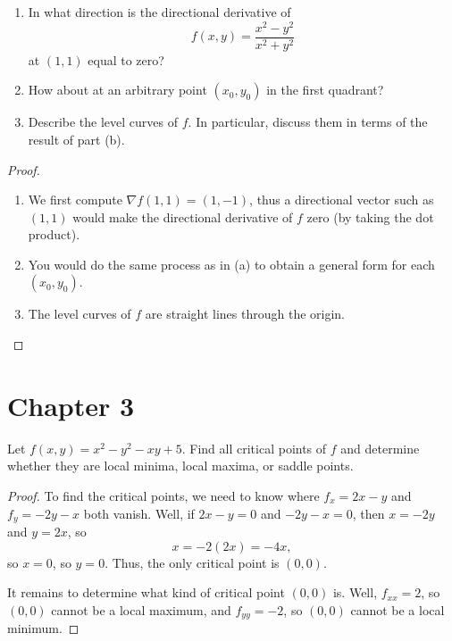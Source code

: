 \documentclass[openany]{book}
\begin{document}
\begin{prob}[59]
    \begin{enumerate}
        \item[(a)] In what direction is the directional derivative of  
        \[
        f(x, y) = \frac{x^2 - y^2}{x^2 + y^2}
        \]
        at \((1, 1)\) equal to zero?  
        \item[(b)] How about at an arbitrary point \((x_0, y_0)\) in the first quadrant?  
        \item[(c)] Describe the level curves of \(f\). In particular, discuss them in terms of the result of part (b).
    \end{enumerate}
\end{prob}
\begin{proof}
    \begin{enumerate}
        \item[(a)] We first compute $\nabla f(1,1)=(1,-1)$, thus a directional vector such as $(1,1)$ would make the directional derivative of $f$ zero (by taking the dot product).
        \item[(b)] You would do the same process as in (a) to obtain a general form for each $(x_0, y_0)$.
        \item[(c)] The level curves of $f$ are straight lines through the origin.
    \end{enumerate}
\end{proof}






\section{Chapter 3}
\begin{prob}[3]
    Let \( f(x, y) = x^2 - y^2 - xy + 5 \). Find all critical points of \( f \) and determine whether they are local minima, local maxima, or saddle points.
\end{prob}
\begin{proof}
    To find the critical points, we need to know where $f_x=2x-y$ and $f_y=-2y-x$ both vanish. Well, if $2x-y=0$ and $-2y-x=0$, then $x=-2y$ and $y=2x$, so
    \[x=-2(2x)=-4x,\]
    so $x=0$, so $y=0$. Thus, the only critical point is $(0,0)$.

    It remains to determine what kind of critical point $(0,0)$ is. Well, $f_{xx}=2$, so $(0,0)$ cannot be a local maximum, and $f_{yy}=-2$, so $(0,0)$ cannot be a local minimum.
\end{proof}
\end{document}
